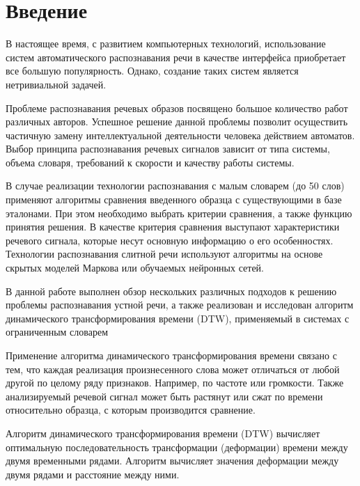 \documentclass[a4paper,14pt,russian,utf8,nocolumnsxix,nocolumnxxxi,nocolumnxxxii]{eskdtext}
\begin{document}
\tableofcontents %
\pagebreak

\section*{Введение}
В настоящее время, с развитием компьютерных технологий, использование систем автоматического распознавания речи в качестве интерфейса приобретает все большую популярность. Однако, создание таких систем является нетривиальной задачей.

Проблеме распознавания речевых образов посвящено большое количество работ различных авторов.\cite{mazurenko,vincuk,spokenlang} Успешное решение данной проблемы позволит осуществить частичную замену интеллектуальной деятельности человека действием автоматов. Выбор принципа распознавания речевых сигналов зависит от типа системы, объема словаря, требований к скорости и качеству работы системы. 

В случае реализации технологии распознавания с малым словарем (до 50 слов) применяют алгоритмы сравнения введенного образца с существующими в базе эталонами. При этом необходимо выбрать критерии сравнения, а также функцию принятия решения. В качестве критерия сравнения выступают характеристики речевого сигнала, которые несут основную информацию о его особенностях. Технологии распознавания слитной речи используют алгоритмы на основе скрытых моделей Маркова или обучаемых нейронных сетей.

В данной работе выполнен обзор нескольких различных подходов к решению проблемы распознавания устной речи, а также реализован и исследован алгоритм динамического трансформирования времени (DTW), применяемый в системах с ограниченным словарем

Применение алгоритма динамического трансформирования времени связано с тем, что каждая реализация произнесенного слова может отличаться от любой другой по целому ряду признаков. Например, по частоте или громкости. Также анализируемый речевой сигнал может быть растянут или сжат по времени относительно образца, с которым производится сравнение. 

Алгоритм динамического трансформирования времени (DTW) вычисляет оптимальную последовательность трансформации (деформации) времени между двумя временными рядами. Алгоритм вычисляет значения деформации между двумя рядами и расстояние между ними.\cite{sakoe}
\end{document}
